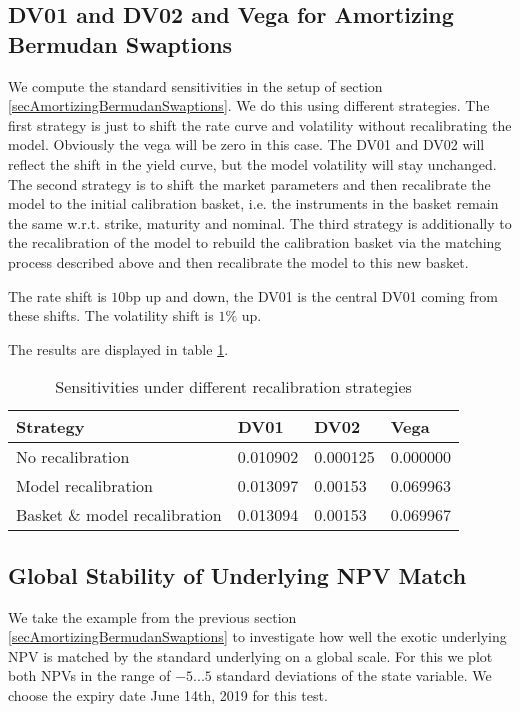 \documentclass{amsart}
\theoremstyle{plain}
\numberwithin{equation}{section}
\begin{document}
\subsection{DV01 and DV02 and Vega for Amortizing Bermudan Swaptions}

We compute the standard sensitivities in the setup of section \ref{secAmortizingBermudanSwaptions}. We do this using
different strategies. The first strategy is just to shift the rate curve and volatility without recalibrating the model.
Obviously the vega will be zero in this case. The DV01 and DV02 will reflect the shift in the yield curve, but the model
volatility will stay unchanged. The second strategy is to shift the market parameters and then recalibrate the model
to the initial calibration basket, i.e. the instruments in the basket remain the same w.r.t. strike, maturity and nominal.
The third strategy is additionally to the recalibration of the model to rebuild the calibration basket via the matching
process described above and then recalibrate the model to this new basket.

The rate shift is $10$bp up and down, the DV01 is the central DV01 coming from these shifts. The volatility shift is $1\%$ up.

The results are displayed in table \ref{sensisAmortizingBermudanSwaption}.

\begin{table}[ht]
\caption{Sensitivities under different recalibration strategies}
\begin{tabular}{l | l | l | l}
Strategy & DV01 & DV02 & Vega \\ \hline
No recalibration & 0.010902 & 0.000125 & 0.000000 \\
Model recalibration & 0.013097 & 0.00153 & 0.069963 \\
Basket \& model recalibration & 0.013094 & 0.00153 & 0.069967 \\
\end{tabular}
\label{sensisAmortizingBermudanSwaption}
\end{table}

\subsection{Global Stability of Underlying NPV Match}

We take the example from the previous section \ref{secAmortizingBermudanSwaptions} to investigate how well the exotic underlying NPV
is matched by the standard underlying on a global scale. For this we plot both NPVs in the range of $-5...5$ standard
deviations of the state variable. We choose the expiry date June 14th, 2019 for this test.
\end{document}
